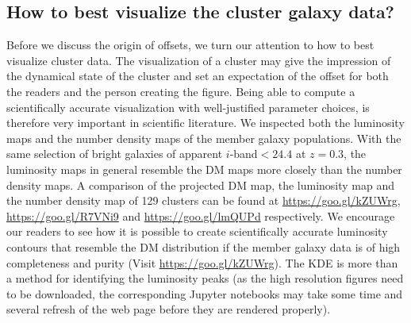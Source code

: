 \subsection{How to best visualize the cluster galaxy data?}
Before we discuss the origin of offsets, we turn our attention to how to best
visualize cluster data. The visualization of a cluster may give
the impression of the dynamical state of the cluster and set an expectation of
the offset for both the readers and the person creating the figure. 
Being able to compute a scientifically accurate visualization
with well-justified parameter choices, is therefore very important in scientific literature.
We inspected both the luminosity maps and the
number density maps of the member galaxy populations.
With the same selection of bright galaxies of apparent $i$-band$ < 24.4$ at
$z=0.3$, the luminosity maps in general resemble the DM maps more closely than 
the number density maps.
A comparison of the projected 
DM map, the luminosity map and the number density map of 129 clusters 
can be found at \href{https://goo.gl/kZUWrg}{https://goo.gl/kZUWrg}, 
\href{https://goo.gl/R7VNi9}{https://goo.gl/R7VNi9} and
\href{https://goo.gl/lmQUPd}{https://goo.gl/lmQUPd} respectively. 
We encourage our readers to see how it is possible
to create scientifically accurate luminosity contours 
that resemble 
the DM distribution if the member galaxy
data is of high completeness and purity (Visit
\href{https://goo.gl/kZUWrg}{https://goo.gl/kZUWrg}). The KDE is more than a method for
identifying the luminosity peaks
(as the high resolution figures need to be downloaded, the 
corresponding Jupyter notebooks may take some time and several refresh of the
web page before they are rendered properly).

% 

